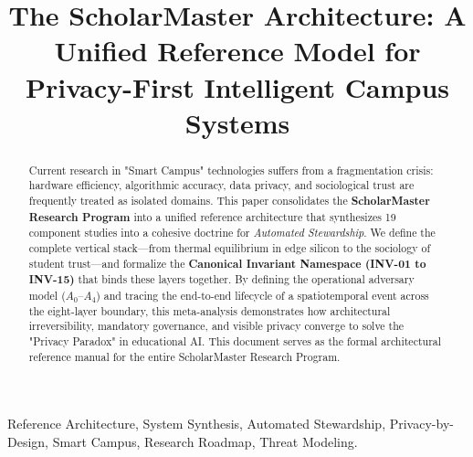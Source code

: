 \documentclass[conference]{IEEEtran}
\theoremstyle{definition}
\begin{document}
\title{The ScholarMaster Architecture: A Unified Reference Model for Privacy-First Intelligent Campus Systems}

\author{
}

\maketitle

\begin{abstract}
Current research in "Smart Campus" technologies suffers from a fragmentation crisis: hardware efficiency, algorithmic accuracy, data privacy, and sociological trust are frequently treated as isolated domains. This paper consolidates the \textbf{ScholarMaster Research Program} into a unified reference architecture that synthesizes 19 component studies into a cohesive doctrine for \textit{Automated Stewardship}. We define the complete vertical stack—from thermal equilibrium in edge silicon to the sociology of student trust—and formalize the \textbf{Canonical Invariant Namespace (INV-01 to INV-15)} that binds these layers together. By defining the operational adversary model ($A_0$--$A_4$) and tracing the end-to-end lifecycle of a spatiotemporal event across the eight-layer boundary, this meta-analysis demonstrates how architectural irreversibility, mandatory governance, and visible privacy converge to solve the "Privacy Paradox" in educational AI. This document serves as the formal architectural reference manual for the entire ScholarMaster Research Program.
\end{abstract}

\begin{IEEEkeywords}
Reference Architecture, System Synthesis, Automated Stewardship, Privacy-by-Design, Smart Campus, Research Roadmap, Threat Modeling.
\end{IEEEkeywords}

\end{document}
